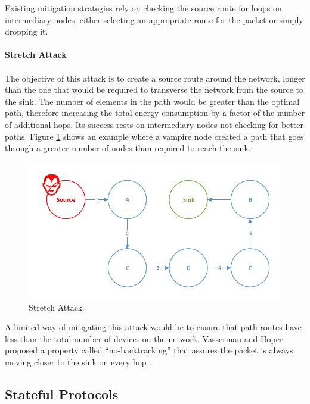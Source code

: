 Existing mitigation strategies rely on checking the source route for loops on intermediary nodes, either selecting an appropriate route for the packet or simply dropping it.

\paragraph{\textbf{Stretch Attack}}
\paragraph{}
The objective of this attack is to create a source route around the network, longer than the one that would be required to transverse the network from the source to the sink. The number of elements in the path would be greater than the optimal path, therefore increasing the total energy consumption by a factor of the number of additional hops. Its success rests on intermediary nodes not checking for better paths. Figure \ref{fig:stretch_attack} shows an example where a vampire node created a path that goes through a greater number of nodes than required to reach the sink.

\begin{figure}[h]
  \centering
  \includegraphics[width=0.8\linewidth]{figures/Stretch_Attack.pdf}
  \caption{Stretch Attack.}
  \label{fig:stretch_attack}
\end{figure}

A limited way of mitigating this attack would be to ensure that path routes have less than the total number of devices on the network. Vasserman and Hoper proposed a property called ``no-backtracking'' that assures the packet is always moving closer to the sink on every hop \cite{Vasserman2013}.
\pagebreak
\subsection{Stateful Protocols}
\label{sec:tables_routing}
